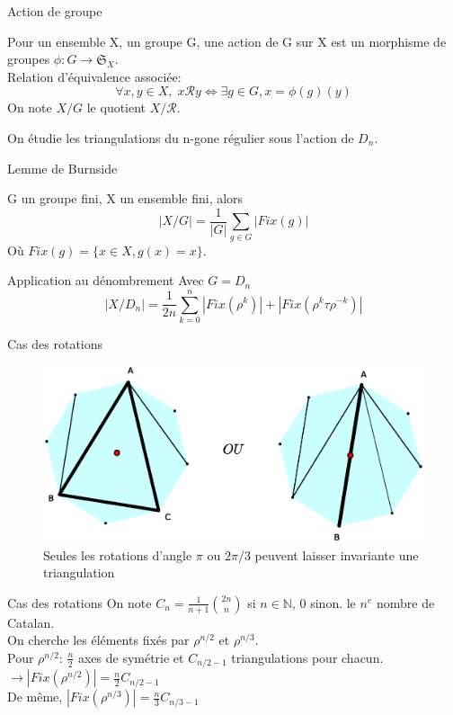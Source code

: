 \documentclass[french,xcolor=dvipsnames]{beamer}
\begin{document}
		\begin{frame}{Action de groupe}
			\begin{definition}
			Pour un ensemble X, un groupe G, une action de G sur X est un morphisme de groupes
			$\phi: G \rightarrow \mathfrak{S}_{X}$.\\
			Relation d'équivalence associée:
			\[
				\forall x,y \in X,\; x \mathcal{R} y \Leftrightarrow \exists g \in G, x=\phi(g)(y)
			\]
			On note $X/G$ le quotient $X/\mathcal{R}$.
			\end{definition}
			
			On étudie les triangulations du n-gone régulier sous l'action de $D_{n}$.
		\end{frame}
		
		\begin{frame}{Lemme de Burnside}
			\begin{theorem}
				G un groupe fini, X un ensemble fini, alors
				\[
				|X/G| = \frac{1}{|G|}\sum_{g\in G}{|Fix(g)|}
				\]
				Où $Fix(g) = \{x\in X, g(x) = x\}$.
			\end{theorem}
		\end{frame}
		
		\begin{frame}{Application au dénombrement}
			Avec $G=D_{n}$
			\[
				|X/D_{n}| = \frac{1}{2n}\sum_{k=0}^{n}|Fix(\rho^{k})|+|Fix(\rho^{k}\tau\rho^{-k})|
			\]
		\end{frame}
		\begin{frame}{Cas des rotations}
		\begin{figure}[1]
		\includegraphics[scale=0.45]{invariances_rotation.eps}
			\caption{Seules les rotations d'angle $\pi$ ou $2\pi/3$ peuvent laisser invariante une triangulation}
			\end{figure}
		\end{frame}
		
		\begin{frame}{Cas des rotations}
			On note $C_{n}=\frac{1}{n+1}\binom{2n}{n}$ si $n\in\mathbb{N}$, $0$ sinon. 
 le $n^{e}$ nombre de Catalan.\\
			On cherche les éléments fixés par $\rho^{n/2}$ et $\rho^{n/3}$.\\
			Pour $\rho^{n/2}$: $\frac{n}{2}$ axes de symétrie et $C_{n/2-1}$ triangulations pour chacun.\\
			$\longrightarrow |Fix(\rho^{n/2})|=\frac{n}{2}C_{n/2-1}$\\
			De même, $|Fix(\rho^{n/3})|=\frac{n}{3}C_{n/3-1}$
		\end{frame}
	
\end{document}
